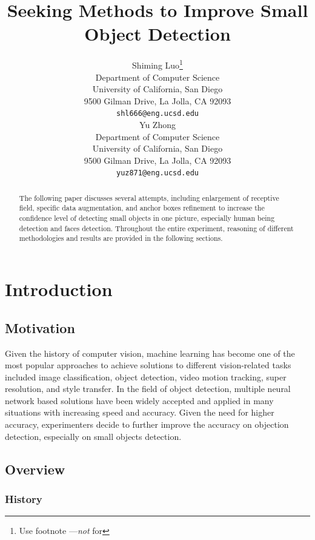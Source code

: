 \documentclass{article}
\title{Seeking Methods to Improve Small Object Detection}
\author{
  Shiming Luo\thanks{Use footnote ---\emph{not} for} \\
  Department of Computer Science\\
  University of California, San Diego\\
  9500 Gilman Drive, La Jolla, CA 92093\\
  \texttt{shl666@eng.ucsd.edu} \\
  \And
  Yu Zhong \\
  Department of Computer Science \\
  University of California, San Diego \\
  9500 Gilman Drive, La Jolla, CA 92093\\
  \texttt{yuz871@eng.ucsd.edu} \\
}
\begin{document}

\maketitle

\begin{abstract}
  The following paper discusses several attempts, including enlargement of receptive 
  field, specific data augmentation, and anchor boxes refinement to increase the confidence
  level of detecting small objects in one picture, especially human being detection
  and faces detection. Throughout the entire experiment, reasoning of different
  methodologies and results are provided in the following sections.
\end{abstract}

\section{Introduction}

\subsection{Motivation}
Given the history of computer vision, machine learning has become one of the most popular 
approaches to achieve solutions to different vision-related tasks included image classification, 
object detection, video motion tracking, super resolution, and style transfer. In the field of object 
detection, multiple neural network based solutions have been widely accepted and applied in many 
situations with increasing speed and accuracy. Given the need for higher accuracy, experimenters 
decide to further improve the accuracy on objection detection, especially on small objects detection.

\subsection{Overview}

\subsubsection{History}
\end{document}
